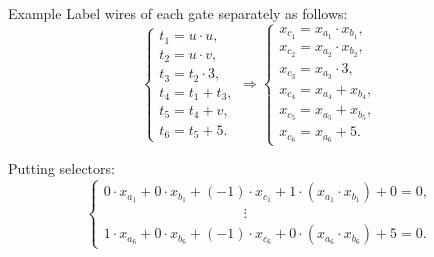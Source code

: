\documentclass{beamer}
\begin{document}
	\begin{frame}{Example}
		Label wires of each gate separately as follows:
		\begin{equation*}
			\begin{cases}
				t_1 = u \cdot u,\\
				t_2 = u \cdot v,\\
				t_3 = t_2 \cdot 3,\\
				t_4 = t_1 + t_3,\\
				t_5 = t_4 + v,\\
				t_6 = t_5 + 5.
			\end{cases}
			\Rightarrow
			\begin{cases}
				x_{c_1} = x_{a_1} \cdot x_{b_1},\\
				x_{c_2} = x_{a_2} \cdot x_{b_2},\\
				x_{c_3} = x_{a_3} \cdot 3,\\
				x_{c_4} = x_{a_4} + x_{b_4},\\
				x_{c_5} = x_{a_5} + x_{b_5},\\
				x_{c_6} = x_{a_6} + 5.
			\end{cases}
		\end{equation*}
	
		Putting selectors:
		\begin{equation*}
			\begin{cases}
				0 \cdot x_{a_1} + 0 \cdot x_{b_1} + (-1) \cdot x_{c_1} + 1 \cdot (x_{a_1}\cdot x_{b_1}) + 0 = 0,\\
				\qquad\qquad\qquad\qquad\qquad\vdots \\
				1 \cdot x_{a_6} + 0 \cdot x_{b_6} + (-1) \cdot x_{c_6} + 0 \cdot (x_{a_6}\cdot x_{b_6}) + 5 = 0.
			\end{cases}
		\end{equation*}
	\end{frame}
\end{document}
